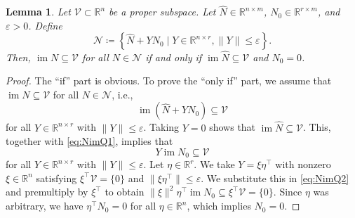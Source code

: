 \documentclass[9pt,shortpaper,twoside,web]{ieeecolor}
\DeclareMathOperator{\im}{im}
\newcommand{\set}[2]{\left\{#1 \mid #2\right\}}
\newtheorem{lemma}[theorem]{Lemma}
\begin{document}
\begin{lemma}
\label{lem:imker_all}
Let $\mathcal{V} \subset \mathbb{R}^n$ be a proper subspace. Let $\hat{N}\in\mathbb{R}^{n\times m}$, $N_0\in\mathbb{R}^{r\times m}$, and $\varepsilon>0$. Define
\begin{equation}
\mathcal{N}\coloneqq\set{\hat{N}+YN_0}{Y\in\mathbb{R}^{n\times r},\|Y\|\leq \varepsilon}.
\end{equation}
Then, $\im N\subseteq\mathcal{V}$ for all $N\in\mathcal{N}$ \emph{if and only if} $\im \hat{N}\subseteq \mathcal{V}$ and $N_0=0$.  %
\end{lemma}
\begin{proof}
The ``if'' part is obvious. To prove the ``only if'' part, we assume that $\im N\subseteq \mathcal{V}$ for all $N\in\mathcal{N}$, i.e.,
\begin{equation}
\label{eq:NimQ1}
\im (\hat{N} +YN_0)\subseteq \mathcal{V}
\end{equation}
for all $Y\in\mathbb{R}^{n\times r}$ with $\|Y\|\leq \varepsilon$. Taking $Y=0$ shows that \mbox{$\im \hat{N}\subseteq \mathcal{V}$}. This, together with \eqref{eq:NimQ1}, implies that
\begin{equation}
\label{eq:NimQ2}
Y\im N_0\subseteq \mathcal{V}
\end{equation}
for all $Y\in\mathbb{R}^{n\times r}$ with $\|Y\|\leq \varepsilon$. Let $\eta\in\mathbb{R}^r$. We take $Y=\xi\eta^\top$ with nonzero $\xi\in\mathbb{R}^n$ satisfying $\xi^\top\mathcal{V}=\{0\}$ and $\|\xi\eta^\top\|\leq \varepsilon$. We substitute this in \eqref{eq:NimQ2} and premultiply by $\xi^\top$ to obtain \mbox{$\|\xi\|^2\eta^\top \im N_0\subseteq \xi^\top\mathcal{V}=\{0\}$}. Since $\eta$ was arbitrary, we have $\eta^\top N_0=0$ for all $\eta\in\mathbb{R}^n$, which implies $N_0=0$. 
\end{proof}
\end{document}
